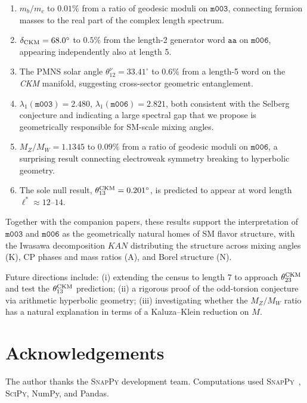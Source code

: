 \documentclass[a4paper,11pt]{article}
\newcommand{\mfld}[1]{\texttt{#1}}
\newcommand{\word}[1]{\texttt{#1}}
\newcommand{\degr}{^{\circ}}
\begin{document}
\begin{enumerate}
\item $m_b/m_c$ to $0.01\%$ from a ratio of geodesic moduli on $\mfld{m003}$,
      connecting fermion masses to the real part of the complex length spectrum.
\item $\delta_{\rm CKM}=68.0\degr$ to $0.5\%$ from the length-2 generator word
      $\word{aa}$ on $\mfld{m006}$, appearing independently also at length 5.
\item The PMNS solar angle $\theta_{12}^\nu=33.41\degr$ to $0.6\%$ from a
      length-5 word on the \emph{CKM} manifold, suggesting cross-sector
      geometric entanglement.
\item $\lambda_1(\mfld{m003})=2.480$, $\lambda_1(\mfld{m006})=2.821$,
      both consistent with the Selberg conjecture and indicating a large
      spectral gap that we propose is geometrically responsible for
      SM-scale mixing angles.
\item $M_Z/M_W=1.1345$ to $0.09\%$ from a ratio of geodesic moduli on
      $\mfld{m006}$, a surprising result connecting electroweak symmetry
      breaking to hyperbolic geometry.
\item The sole null result, $\theta_{13}^{\rm CKM}=0.201\degr$, is predicted
      to appear at word length $\ell^*\approx 12$--$14$.
\end{enumerate}

Together with the companion papers, these results support the interpretation
of $\mfld{m003}$ and $\mfld{m006}$ as the geometrically natural homes of SM
flavor structure, with the Iwasawa decomposition $KAN$ distributing the
structure across mixing angles (K), CP phases and mass ratios (A), and
Borel structure (N).

Future directions include: (i) extending the census to length 7 to approach
$\theta_{23}^{\rm CKM}$ and test the $\theta_{13}^{\rm CKM}$ prediction;
(ii) a rigorous proof of the odd-torsion conjecture via arithmetic hyperbolic
geometry; (iii) investigating whether the $M_Z/M_W$ ratio has a natural
explanation in terms of a Kaluza--Klein reduction on $M$.

\section*{Acknowledgements}
The author thanks the \textsc{SnapPy} development team.
Computations used \textsc{SnapPy}~\cite{SnapPy}, \textsc{SciPy}, NumPy,
and Pandas.
\end{document}
